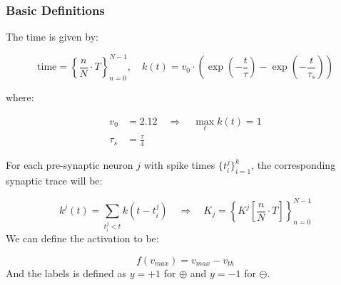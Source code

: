 \subsubsection{Basic Definitions}

The time is given by:

\begin{equation} \label{eq:cuba-model}
    \text{time} = \left\{\frac{n}{N} \cdot T\right\}_{n=0}^{N-1}, \quad k(t) = v_0 \cdot \left(\exp\left(-\frac{t}{\tau}\right) - \exp\left(-\frac{t}{\tau_s}\right)\right)
\end{equation}

where:

\begin{align*}
    v_0 &= 2.12 \quad \Rightarrow \quad \max_t k(t) = 1 \\
    \tau_s &= \frac{\tau}{4}
\end{align*}

For each pre-synaptic neuron $j$ with spike times $\{t_i^j\}_{i=1}^k$, the corresponding synaptic trace will be:

\begin{equation}
    k^j(t) = \sum_{t_i^j < t} k(t - t_i^j) \quad \Rightarrow \quad K_j = \left\{K^j\left[\frac{n}{N} \cdot T\right]\right\}_{n=0}^{N-1}
\end{equation}
We can define the activation to be:

\begin{equation}
    f(v_{max}) = v_{max} - v_{th}
\end{equation}
And the labels is defined as $y = +1$ for $\oplus$ and $y=-1$ for $\ominus$.